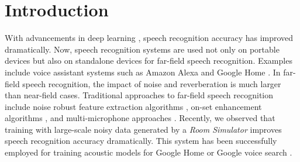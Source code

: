 \documentclass[a4paper]{article}
\begin{document}
\section{Introduction}
With advancements in deep learning
\cite{Seltzer2013DNNAurora4, Yu2013FeatureLearningDNN, V_Vanhoucke_Deep_Learning_NIPS_Workshop_2011,
G_Hinton_IEEE_Signal_Process_Mag_2012,
T_Sainath_IEEETran_2017_1, T_Sainath_Book_Chapter_2017_1},
speech recognition accuracy has improved dramatically.
Now, speech recognition systems
are used not only on portable devices
but also on standalone devices for far-field speech recognition.
Examples include voice assistant systems such as Amazon Alexa
and Google Home \cite{C_Kim_INTERSPEECH_2017_1, B_Li_INTERSPEECH_2017_1}.
In far-field speech recognition, the impact of noise and reverberation
is much larger than near-field cases. Traditional approaches to far-field
speech recognition include noise robust feature extraction algorithms
\cite{C_Kim_IEEETran_2016_1, U_H_Yapanel_SpeechComm_2008, C_Kim_ICASSP_2010_1},
on-set enhancement algorithms
\cite{C_Kim_INTERSPEECH_2010_2, C_Kim_INTERSPEECH_2014_2}, and multi-microphone
approaches \cite{T_Nekatani_ICASSP_2017_1, T_Higuchi_ICASSP_2016_1,
H_Erdogan_INTERSPEECH_2016_1, C_Kim_INTERSPEECH_2015_1, C_Kim_INTERSPEECH_2009_1, C_Kim_ICASSP_2012_2, C_Kim_ICASSP_2011_2}.
Recently, we observed that training with large-scale noisy data generated
by a \textit{Room Simulator} \cite{C_Kim_INTERSPEECH_2017_1}
improves speech recognition accuracy dramatically.
This system has been successfully employed
for training acoustic models for Google Home or Google voice
search \cite{C_Kim_INTERSPEECH_2017_1}.
\end{document}
